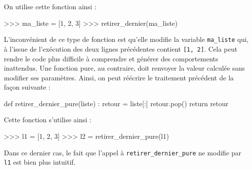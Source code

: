 \documentclass[
  a4paper,
  DIV=11,
  numbers=noendperiod]{scrartcl}
\newenvironment{Shaded}{\begin{snugshade}}{\end{snugshade}}
\newcommand{\ControlFlowTok}[1]{\textcolor[rgb]{0.00,0.23,0.31}{#1}}
\newcommand{\DecValTok}[1]{\textcolor[rgb]{0.68,0.00,0.00}{#1}}
\newcommand{\KeywordTok}[1]{\textcolor[rgb]{0.00,0.23,0.31}{#1}}
\newcommand{\NormalTok}[1]{\textcolor[rgb]{0.00,0.23,0.31}{#1}}
\newcommand{\OperatorTok}[1]{\textcolor[rgb]{0.37,0.37,0.37}{#1}}
\begin{document}
On utilise cette fonction ainsi :

\begin{Shaded}
\begin{Highlighting}[]
\OperatorTok{\textgreater{}\textgreater{}\textgreater{}}\NormalTok{ ma\_liste }\OperatorTok{=}\NormalTok{ [}\DecValTok{1}\NormalTok{, }\DecValTok{2}\NormalTok{, }\DecValTok{3}\NormalTok{]}
\OperatorTok{\textgreater{}\textgreater{}\textgreater{}}\NormalTok{ retirer\_dernier(ma\_liste)}
\end{Highlighting}
\end{Shaded}

L'inconvénient de ce type de fonction est qu'elle modifie la variable
\texttt{ma\_liste} qui, à l'issue de l'exécution des deux lignes
précédentes contient \texttt{{[}1,\ 2{]}}. Cela peut rendre le code plus
difficile à comprendre et générer des comportements inattendus. Une
fonction pure, au contraire, doit renvoyer la valeur calculée sans
modifier ses paramètres. Ainsi, on peut réécrire le traitement précédent
de la façon suivante :

\begin{Shaded}
\begin{Highlighting}[]
\KeywordTok{def}\NormalTok{ retirer\_dernier\_pure(liste) :}
\NormalTok{    retour }\OperatorTok{=}\NormalTok{ liste[:]}
\NormalTok{    retour.pop()}
    \ControlFlowTok{return}\NormalTok{ retour}
\end{Highlighting}
\end{Shaded}

Cette fonction s'utilise ainsi :

\begin{Shaded}
\begin{Highlighting}[]
\OperatorTok{\textgreater{}\textgreater{}\textgreater{}}\NormalTok{ l1 }\OperatorTok{=}\NormalTok{ [}\DecValTok{1}\NormalTok{, }\DecValTok{2}\NormalTok{, }\DecValTok{3}\NormalTok{]}
\OperatorTok{\textgreater{}\textgreater{}\textgreater{}}\NormalTok{ l2 }\OperatorTok{=}\NormalTok{ retirer\_dernier\_pure(l1)}
\end{Highlighting}
\end{Shaded}

Dans ce dernier cas, le fait que l'appel à
\texttt{retirer\_dernier\_pure} ne modifie par \texttt{l1} est bien plus
intuitif.
\end{document}
